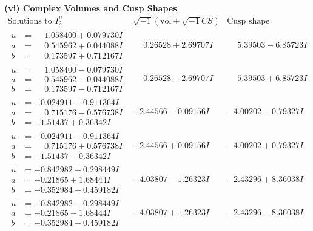 \documentclass[1p]{elsarticle_modified}
\theoremstyle{definition}
\newcommand{\I}{\sqrt{-1}}
\begin{document}
\newpage\flushleft \textbf{(vi) Complex Volumes and Cusp Shapes}
$$\begin{array}{c|c|c}  
\text{Solutions to }I^u_{2}& \I (\text{vol} + \sqrt{-1}CS) & \text{Cusp shape}\\
 \hline 
\begin{aligned}
u &= \phantom{-}1.058400 + 0.079730 I \\
a &= \phantom{-}0.545962 + 0.044088 I \\
b &= \phantom{-}0.173597 + 0.712167 I\end{aligned}
 & \phantom{-}0.26528 + 2.69707 I & \phantom{-}5.39503 - 6.85723 I \\ \hline\begin{aligned}
u &= \phantom{-}1.058400 - 0.079730 I \\
a &= \phantom{-}0.545962 - 0.044088 I \\
b &= \phantom{-}0.173597 - 0.712167 I\end{aligned}
 & \phantom{-}0.26528 - 2.69707 I & \phantom{-}5.39503 + 6.85723 I \\ \hline\begin{aligned}
u &= -0.024911 + 0.911364 I \\
a &= \phantom{-}0.715176 - 0.576738 I \\
b &= -1.51437 + 0.36342 I\end{aligned}
 & -2.44566 - 0.09156 I & -4.00202 - 0.79327 I \\ \hline\begin{aligned}
u &= -0.024911 - 0.911364 I \\
a &= \phantom{-}0.715176 + 0.576738 I \\
b &= -1.51437 - 0.36342 I\end{aligned}
 & -2.44566 + 0.09156 I & -4.00202 + 0.79327 I \\ \hline\begin{aligned}
u &= -0.842982 + 0.298449 I \\
a &= -0.21865 + 1.68444 I \\
b &= -0.352984 - 0.459182 I\end{aligned}
 & -4.03807 - 1.26323 I & -2.43296 + 8.36038 I \\ \hline\begin{aligned}
u &= -0.842982 - 0.298449 I \\
a &= -0.21865 - 1.68444 I \\
b &= -0.352984 + 0.459182 I\end{aligned}
 & -4.03807 + 1.26323 I & -2.43296 - 8.36038 I \\ \hline\begin{aligned}

\end{aligned}
\end{array}$$
\end{document}
